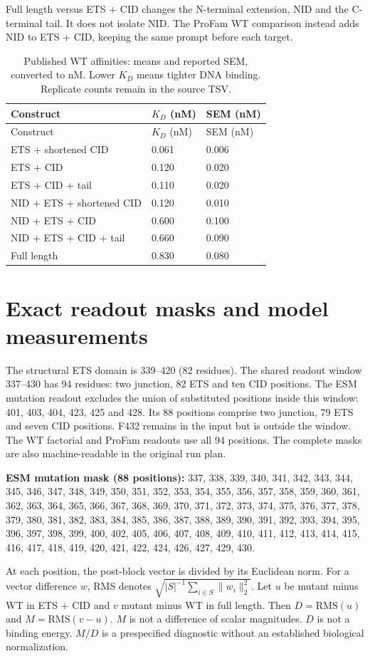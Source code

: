 \documentclass[a4paper,11pt]{scrartcl}
\begin{document}
Full length versus ETS + CID changes the N-terminal extension, NID and the C-terminal tail. It does not isolate NID. The ProFam WT comparison instead adds NID to ETS + CID, keeping the same prompt before each target.

\begingroup\small
\begin{longtable}{@{}lll@{}}
\caption{Published WT affinities: means and reported SEM, converted to nM. Lower $K_D$ means tighter DNA binding. Replicate counts remain in the source TSV.}\\
\toprule Construct & $K_D$ (nM) & SEM (nM)\\\midrule\endfirsthead
\toprule Construct & $K_D$ (nM) & SEM (nM)\\\midrule\endhead
ETS + shortened CID & 0.061 & 0.006\\
ETS + CID & 0.120 & 0.020\\
ETS + CID + tail & 0.110 & 0.020\\
NID + ETS + shortened CID & 0.120 & 0.010\\
NID + ETS + CID & 0.600 & 0.100\\
NID + ETS + CID + tail & 0.660 & 0.090\\
Full length & 0.830 & 0.080\\
\bottomrule\end{longtable}
\endgroup
\section{Exact readout masks and model measurements}
The structural ETS domain is 339--420 (82 residues). The shared readout window 337--430 has 94 residues: two junction, 82 ETS and ten CID positions. The ESM mutation readout excludes the union of substituted positions inside this window: 401, 403, 404, 423, 425 and 428. Its 88 positions comprise two junction, 79 ETS and seven CID positions. F432 remains in the input but is outside the window. The WT factorial and ProFam readouts use all 94 positions. The complete masks are also machine-readable in the original run plan.

\noindent\textbf{ESM mutation mask (88 positions):} 
337, 338, 339, 340, 341, 342, 343, 344, 345, 346, 347, 348, 349, 350, 351, 352, 353, 354, 355, 356, 357, 358, 359, 360, 361, 362, 363, 364, 365, 366, 367, 368, 369, 370, 371, 372, 373, 374, 375, 376, 377, 378, 379, 380, 381, 382, 383, 384, 385, 386, 387, 388, 389, 390, 391, 392, 393, 394, 395, 396, 397, 398, 399, 400, 402, 405, 406, 407, 408, 409, 410, 411, 412, 413, 414, 415, 416, 417, 418, 419, 420, 421, 422, 424, 426, 427, 429, 430.\par
At each position, the post-block vector is divided by its Euclidean norm. For a vector difference $w$, RMS denotes $\sqrt{|S|^{-1}\sum_{i\in S}\|w_i\|_2^2}$. Let $u$ be mutant minus WT in ETS + CID and $v$ mutant minus WT in full length. Then $D=\mathrm{RMS}(u)$ and $M=\mathrm{RMS}(v-u)$. $M$ is not a difference of scalar magnitudes. $D$ is not a binding energy. $M/D$ is a prespecified diagnostic without an established biological normalization.
\end{document}
